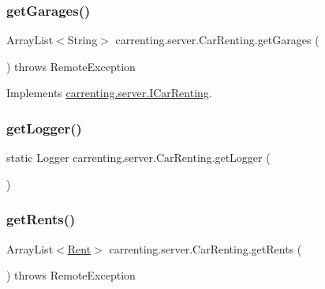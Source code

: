 \subsubsection{\texorpdfstring{getGarages()}{getGarages()}}
{\footnotesize\ttfamily Array\+List$<$String$>$ carrenting.\+server.\+Car\+Renting.\+get\+Garages (\begin{DoxyParamCaption}{ }\end{DoxyParamCaption}) throws Remote\+Exception}



Implements \mbox{\hyperlink{interfacecarrenting_1_1server_1_1_i_car_renting_a3192598ccc120a739ca168df03c23681}{carrenting.\+server.\+I\+Car\+Renting}}.

\mbox{\label{classcarrenting_1_1server_1_1_car_renting_ab6247bc987fa497393e8db651849f845}} 
\subsubsection{\texorpdfstring{getLogger()}{getLogger()}}
{\footnotesize\ttfamily static Logger carrenting.\+server.\+Car\+Renting.\+get\+Logger (\begin{DoxyParamCaption}{ }\end{DoxyParamCaption})\hspace{0.3cm}{\ttfamily [static]}}

\mbox{\label{classcarrenting_1_1server_1_1_car_renting_aa888e82a1c7d54b10c1e2d8b02b5a363}} 
\subsubsection{\texorpdfstring{getRents()}{getRents()}}
{\footnotesize\ttfamily Array\+List$<$\mbox{\hyperlink{classcarrenting_1_1server_1_1jdo_1_1_rent}{Rent}}$>$ carrenting.\+server.\+Car\+Renting.\+get\+Rents (\begin{DoxyParamCaption}{ }\end{DoxyParamCaption}) throws Remote\+Exception}




